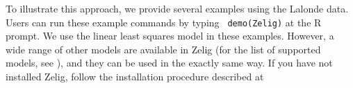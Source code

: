 
To illustrate this approach, we provide several examples using the
Lalonde data. Users can run these example commands by typing {\tt
  demo(Zelig)} at the R prompt. We use the linear least squares model
in these examples. However, a wide range of other models are available
in Zelig (for the list of supported models, see
),
and they can be used in the exactly same way. If you have not
installed Zelig, follow the installation procedure described at

